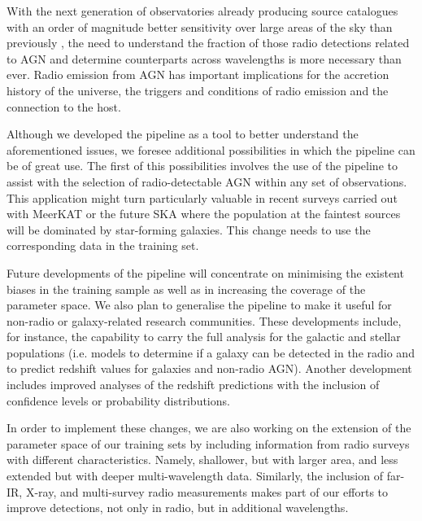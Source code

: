 \documentclass{aa}
\begin{document}

With the next generation of observatories already producing source catalogues with an order of magnitude better sensitivity over large areas of the sky than previously \citep[e.g. RACS, EMU, and MIGHTEE; ][respectively]{2020PASA...37...48M, 2011PASA...28..215N, 2016mks..confE...6J}, the need to understand the fraction of those radio detections related to AGN and determine counterparts across wavelengths is more necessary than ever. Radio emission from AGN has important implications for the accretion history of the universe, the triggers and conditions of radio emission and the connection to the host.

Although we developed the pipeline as a tool to better understand the aforementioned issues, we foresee additional possibilities in which the pipeline can be of great use. The first of this possibilities involves the use of the pipeline to assist with the selection of radio-detectable AGN within any set of observations. This application might turn particularly valuable in recent surveys carried out with MeerKAT \citep{2016mks..confE...1J} or the future SKA where the population at the faintest sources will be dominated by star-forming galaxies. This change needs to use the corresponding data in the training set.

Future developments of the pipeline will concentrate on minimising the existent biases in the training sample as well as in increasing the coverage of the parameter space. We also plan to generalise the pipeline to make it useful for non-radio or galaxy-related research communities. These developments include, for instance, the capability to carry the full analysis for the galactic and stellar populations (i.e. models to determine if a galaxy can be detected in the radio and to predict redshift values for galaxies and non-radio AGN). Another development includes improved analyses of the redshift predictions with the inclusion of confidence levels or probability distributions.

In order to implement these changes, we are also working on the extension of the parameter space of our training sets by including information from radio surveys with different characteristics. Namely, shallower, but with larger area, and less extended but with deeper multi-wavelength data. Similarly, the inclusion of far-IR, X-ray, and multi-survey radio measurements makes part of our efforts to improve detections, not only in radio, but in additional wavelengths.
\end{document}

